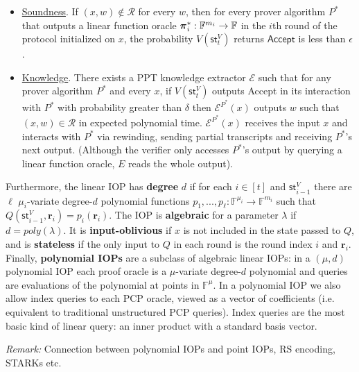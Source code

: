 \begin{definition} 
\begin{itemize}
\item \underline{Soundness}. If $(x, w) \notin \mathcal{R}$ for every $w$, then for every prover algorithm $P^*$ that outputs a linear function oracle $\boldsymbol{\pi}^*_i: \mathbb{F}^{m_i} \rightarrow \mathbb{F}$ in the $i$th round of the protocol initialized on $x$, the probability $V(\textsf{st}^V_t)$ returns $\textsf{Accept}$ is less than $\epsilon$. 

\item \underline{Knowledge}. There exists a PPT knowledge extractor $\mathcal{E}$ such that for any prover algorithm $P^*$ and every $x$, if $V(\textsf{st}^V_t)$ outputs \textsf{Accept} in its interaction with $P^*$ with probability greater than $\delta$ then $\mathcal{E}^{P^*}(x)$ outputs $w$ such that $(x, w) \in \mathcal{R}$ in expected polynomial time. $\mathcal{E}^{P^*}(x)$ receives the input $x$ and interacts with $P^*$ via rewinding, sending partial transcripts and receiving $P^*$'s next output. (Although the verifier only accesses $P^*$'s output by querying a linear function oracle, $E$ reads the whole output). 

\end{itemize}

Furthermore, the linear IOP has \textbf{degree} $d$ if for each $i \in [t]$ and $\textsf{st}^V_{i-1}$ there are $\ell$ $\mu_i$-variate degree-$d$ polynomial functions $p_1,...,p_\ell: \mathbb{F}^{\mu_i} \rightarrow \mathbb{F}^{m_i}$ such that $Q(\textsf{st}^V_{i-1}, \mathbf{r}_i) = p_i(\mathbf{r}_i)$. The IOP is \textbf{algebraic} for a parameter $\lambda$ if $d = poly(\lambda)$. 
It is \textbf{input-oblivious} if $x$ is not included in the state passed to $Q$, and is \textbf{stateless} if the only input to $Q$ in each round is the round index $i$ and $\mathbf{r}_i$.
Finally, \textbf{polynomial IOPs} are a subclass of algebraic linear IOPs: in a $(\mu, d)$ polynomial IOP each proof oracle is a $\mu$-variate degree-$d$ polynomial and queries are evaluations of the polynomial at points in $\mathbb{F}^\mu$. In a polynomial IOP we also allow index queries to each PCP oracle, viewed as a vector of coefficients (i.e. equivalent to traditional unstructured PCP queries). Index queries are the most basic kind of linear query: an inner product with a standard basis vector. 

\end{definition} 

\emph{Remark:} Connection between polynomial IOPs and point IOPs, RS encoding, STARKs etc. 

